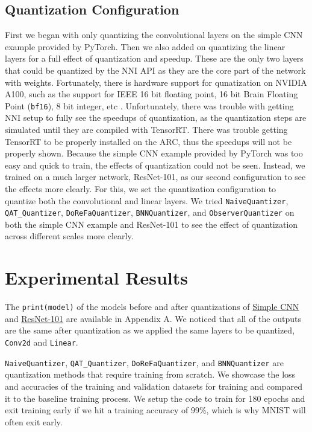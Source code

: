 \documentclass{article}
\begin{document}
\subsection{Quantization Configuration}
First we began with only quantizing the convolutional layers on the simple CNN example provided by PyTorch. Then we also added on quantizing the linear layers for a full effect of quantization and speedup. These are the only two layers that could be quantized by the NNI API as they are the core part of the network with weights. Fortunately, there is hardware support for qunatization on NVIDIA A100, such as the support for IEEE 16 bit floating point, 16 bit Brain Floating Point (\verb|bf16|), 8 bit integer, etc \cite{a100}. Unfortunately, there was trouble with getting NNI setup to fully see the speedups of quantization, as the quantization steps are simulated until they are compiled with TensorRT. There was trouble getting TensorRT to be properly installed on the ARC, thus the speedups will not be properly shown. Because the simple CNN example provided by PyTorch was too easy and quick to train, the effects of quantization could not be seen. Instead, we trained on a much larger network, ResNet-101, as our second configuration to see the effects more clearly. For this, we set the quantization configuration to quantize both the convolutional and linear layers. We tried \verb|NaiveQuantizer|, \verb|QAT_Quantizer|, \verb|DoReFaQuantizer|, \verb|BNNQuantizer|, and \verb|ObserverQuantizer| on both the simple CNN example and ResNet-101 to see the effect of quantization across different scales more clearly.

\section{Experimental Results}

The \verb|print(model)| of the models before and after quantizations of \hyperref[sec:A1]{Simple CNN} and \hyperref[sec:A2]{ResNet-101} are available in Appendix A. We noticed that all of the outputs are the same after quantization as we applied the same layers to be quantized, \verb|Conv2d| and \verb|Linear|.

\verb|NaiveQuantizer|, \verb|QAT_Quantizer|, \verb|DoReFaQuantizer|, and \verb|BNNQuantizer| are quantization methods that require training from scratch. We showcase the loss and accuracies of the training and validation datasets for training and compared it to the baseline training process. We setup the code to train for 180 epochs and exit training early if we hit a training accuracy of 99\%, which is why MNIST will often exit early.
\end{document}
